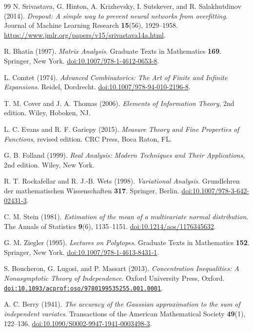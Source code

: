 \documentclass[11pt,letterpaper]{article}
\theoremstyle{remark}
\begin{document}
\begin{thebibliography}{99}
N. Srivastava, G. Hinton, A. Krizhevsky, I. Sutskever, and
R. Salakhutdinov (2014).
\emph{Dropout: A simple way to prevent neural networks from overfitting}.
Journal of Machine Learning Research \textbf{15}(56), 1929--1958.
\url{https://www.jmlr.org/papers/v15/srivastava14a.html}.

R. Bhatia (1997).
\emph{Matrix Analysis}.
Graduate Texts in Mathematics \textbf{169}. Springer, New York.
\href{https://doi.org/10.1007/978-1-4612-0653-8}{doi:10.1007/978-1-4612-0653-8}.

L. Comtet (1974).
\emph{Advanced Combinatorics: The Art of Finite and Infinite Expansions}.
Reidel, Dordrecht.
\href{https://doi.org/10.1007/978-94-010-2196-8}{doi:10.1007/978-94-010-2196-8}.

T. M. Cover and J. A. Thomas (2006).
\emph{Elements of Information Theory}, 2nd edition.
Wiley, Hoboken, NJ.

L. C. Evans and R. F. Gariepy (2015).
\emph{Measure Theory and Fine Properties of Functions}, revised edition.
CRC Press, Boca Raton, FL.

G. B. Folland (1999).
\emph{Real Analysis: Modern Techniques and Their Applications}, 2nd edition.
Wiley, New York.

R. T. Rockafellar and R. J.-B. Wets (1998).
\emph{Variational Analysis}.
Grundlehren der mathematischen Wissenschaften \textbf{317}.
Springer, Berlin.
\href{https://doi.org/10.1007/978-3-642-02431-3}{doi:10.1007/978-3-642-02431-3}.

C. M. Stein (1981).
\emph{Estimation of the mean of a multivariate normal distribution}.
The Annals of Statistics \textbf{9}(6), 1135--1151.
\href{https://doi.org/10.1214/aos/1176345632}{doi:10.1214/aos/1176345632}.

G. M. Ziegler (1995).
\emph{Lectures on Polytopes}.
Graduate Texts in Mathematics \textbf{152}. Springer, New York.
\href{https://doi.org/10.1007/978-1-4613-8431-1}{doi:10.1007/978-1-4613-8431-1}.

S. Boucheron, G. Lugosi, and P. Massart (2013).
\emph{Concentration Inequalities: A Nonasymptotic Theory of Independence}.
Oxford University Press, Oxford.
\href{https://doi.org/10.1093/acprof:oso/9780199535255.001.0001}{\nolinkurl{doi:10.1093/acprof:oso/9780199535255.001.0001}}.

A. C. Berry (1941).
\emph{The accuracy of the Gaussian approximation to the sum of independent variates}.
Transactions of the American Mathematical Society \textbf{49}(1), 122--136.
\href{https://doi.org/10.1090/S0002-9947-1941-0003498-3}{doi:10.1090/S0002-9947-1941-0003498-3}.


\end{thebibliography}
\end{document}
